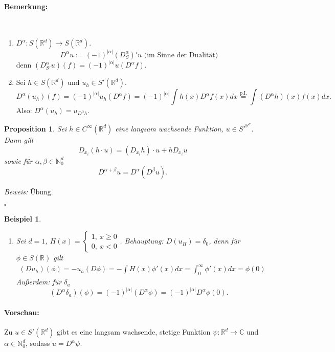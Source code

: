 \documentclass[12pt,a4paper,titlepage]{scrartcl}
\newtheorem{Beispiel}[Satz]{Beispiel}
\newtheorem{Prop}[Satz]{Proposition}
\numberwithin{equation}{section}
\newcommand{\C}{\mathbb{C}} %
\newcommand{\R}{\mathbb{R}} %
\newcommand{\N}{\mathbb{N}} %
\newcommand{\m}{\cdot}
\newcommand{\Bew}{\emph{Beweis: }}
\newcommand{\qed}{\begin{flushright}
		$\square$
	\end{flushright}}
\begin{document}
	\paragraph{Bemerkung:} ~
	\begin{enumerate}
		\item[a)] $D^\alpha: S(\R^d)\rightarrow S(\R^d)$. 
		$$D^\alpha u := (-1)^{|\alpha|}(D_S^\alpha)'u \text{ (im Sinne der Dualität)}$$
		denn $(D_{S'}^\alpha u)(f) = (-1)^{|\alpha|} u(D^\alpha f)$.
		\item[b)] Sei $h\in S(\R^d)$ und $u_h\in S'(\R^d)$. 
		$$D^\alpha(u_h)(f) = (-1)^{|\alpha|} u_h(D^\alpha f) = (-1)^{|\alpha|}\int h(x) D^\alpha f(x) dx \overset{\text{p.I.}}{=} \int(D^\alpha h)(x) f(x) dx.$$
		Also: $\boxed{D^\alpha (u_h) = u_{D^\alpha h}.}$
	\end{enumerate}
	
	\begin{Prop}
		Sei $h\in C^{\infty}(\R^d)$ eine langsam wachsende Funktion, $u\in S'^{\R^d}$. Dann gilt
		$$D_{x_i}(h\m u) = (D_{x_i}h) \m u + h D_{x_i}u$$
		sowie für $\alpha,\beta\in \N_0^d$
		$$D^{\alpha+\beta}u = D^\alpha(D^\beta u).$$
	\end{Prop}
	
	\Bew Übung.
	\qed
	
	\begin{Beispiel}
		~
		\begin{enumerate}
			\item[a)] Sei $d= 1$, $H(x) =\left\{\begin{array}{l}
			1, ~x\geq 0\\
			0, ~x< 0
			\end{array}
			\right.$. Behauptung: $D(u_H) = \delta_0$, denn für $\phi\in S(\R)$ gilt
			\begin{eqnarray}
				(Du_h)(\phi) = -u_h(D\phi) = -\int H(x)\phi'(x)dx = \int_0^\infty \phi'(x) dx = \phi(0)\nonumber
			\end{eqnarray}
			Außerdem: für $\delta_a$
			$$(D^\alpha\delta_a)(\phi) = (-1)^{|\alpha|}(D^\alpha\phi) = (-1)^{|\alpha|}D^\alpha\phi(0).$$
		\end{enumerate}
	\end{Beispiel}
	
	\paragraph{Vorschau:} Zu $u\in S'(\R^d)$ gibt es eine langsam wachsende, stetige Funktion $\psi:\R^d\rightarrow\C$ und $\alpha\in \N_0^d$, sodass $u= D^\alpha\psi$.
	
\end{document}
